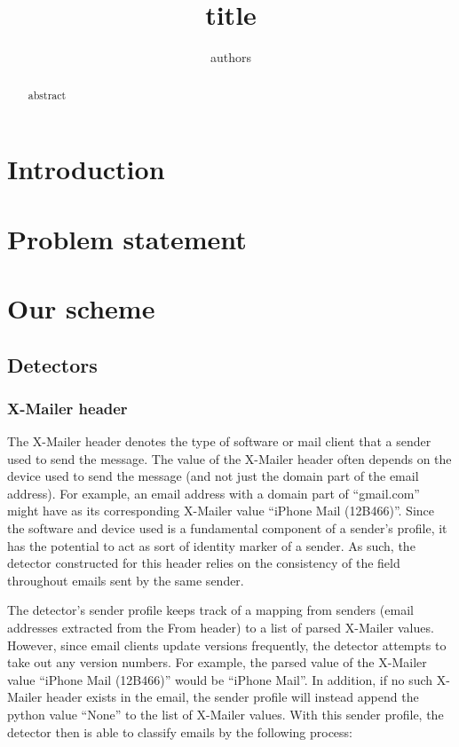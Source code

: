 \documentclass[letterpaper]{article}
\begin{document}
\title{title}
\author{authors}
\maketitle

\begin{abstract}
abstract
\end{abstract}

\section{Introduction}
\section{Problem statement}
\section{Our scheme}

\subsection{Detectors}
\subsubsection{X-Mailer header}

The X-Mailer header denotes the type of software or mail client that a sender used to send the message. The value of the X-Mailer header often depends on the device used to send the message (and not just the domain part of the email address). For example, an email address with a domain part of	``gmail.com'' might have as its corresponding X-Mailer value ``iPhone Mail (12B466)''. Since the software and device used is a fundamental component of a sender's profile, it has the potential to act as sort of identity marker of a sender. As such, the detector constructed for this header relies on the consistency of the field throughout emails sent by the same sender.

The detector's sender profile keeps track of a mapping from senders (email addresses extracted from the From header) to a list of parsed X-Mailer values. However, since email clients update versions frequently, the detector attempts to take out any version numbers. For example, the parsed value of the X-Mailer value ``iPhone Mail (12B466)'' would be ``iPhone Mail''. In addition, if no such X-Mailer header exists in the email, the sender profile will instead append the python value ``None'' to the list of X-Mailer values. With this sender profile, the detector then is able to classify emails by the following process:
\end{document}
